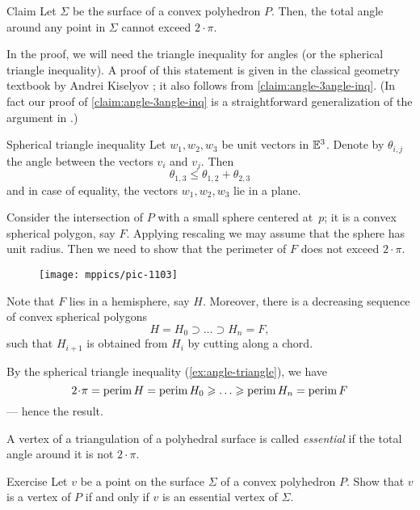 \begin{thm}{Claim}\label{clm:total-angle}
Let $\Sigma$ be the surface of a convex polyhedron $P$.
Then, the total angle around any point in $\Sigma$ cannot exceed $2\cdot\pi$.
\end{thm} 

In the proof, we will need the triangle inequality for angles (or the spherical triangle inequality).
A proof of this statement is given in the classical geometry textbook by Andrei Kiselyov \cite[§ 47]{kiselev-stereo-en};
it also follows from \ref{claim:angle-3angle-inq}.
(In fact our proof of \ref{claim:angle-3angle-inq} is a straightforward generalization of the argument in \cite[§ 47]{kiselev-stereo-en}.)

\begin{thm}{Spherical triangle inequality}\label{ex:angle-triangle}
Let $w_1,w_2,w_3$ be unit vectors in $\mathbb{E}^3$.
Denote by $\theta_{i,j}$ the angle between the vectors $v_i$ and $v_j$.
Then
$$\theta_{1,3}\le \theta_{1,2}+\theta_{2,3}$$
and in case of equality, the vectors $w_1,w_2,w_3$ lie in a plane.
\end{thm}

Consider the intersection of $P$ with a small sphere centered at~$p$;
it is a convex spherical polygon, say $F$.
Applying rescaling we may assume that the sphere has unit radius.
Then we need to show that the perimeter of $F$ does not exceed $2\cdot\pi$.

\begin{wrapfigure}{o}{22mm}
\vskip-2mm
\centering
\texttt{[image: mppics/pic-1103]}
\end{wrapfigure}

Note that $F$ lies in a hemisphere, say $H$.
Moreover, there is a decreasing sequence of convex spherical polygons 
\[H=H_0\supset\dots\supset H_n=F,\]
such that $H_{i+1}$ is obtained from $H_{i}$ by cutting along a chord.

By the spherical triangle inequality (\ref{ex:angle-triangle}), we have
\[
2\cdot\pi=\perim H=\perim H_0\ge\dots\ge\perim H_n=\perim F
\]
--- hence the result.
\qedsf

A vertex of a triangulation of a polyhedral surface is called \emph{essential} if the total angle around it is not $2\cdot\pi$.

\begin{thm}{Exercise}\label{ex:vertex-essential-vertex}
Let $v$ be a point on the surface $\Sigma$ of a convex polyhedron $P$.
Show that $v$ is a vertex of $P$ if and only if 
$v$ is an essential vertex of $\Sigma$.
\end{thm}



